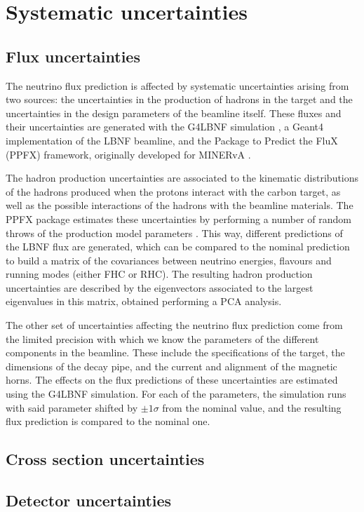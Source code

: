 \section{Systematic uncertainties}

\subsection{Flux uncertainties}

The neutrino flux prediction is affected by systematic uncertainties arising from two sources: the uncertainties in the production of hadrons in the target and the uncertainties in the design parameters of the beamline itself. These fluxes and their uncertainties are generated with the G4LBNF simulation \cite{DUNE2020TDR2}, a Geant4 implementation of the LBNF beamline, and the Package to Predict the FluX (PPFX) framework, originally developed for MINERvA \cite{Golan2016}.

The hadron production uncertainties are associated to the kinematic distributions of the hadrons produced when the protons interact with the carbon target, as well as the possible interactions of the hadrons with the beamline materials. The PPFX package estimates these uncertainties by performing a number of random throws of the production model parameters \cite{Bashyal2017}. This way, different predictions of the LBNF flux are generated, which can be compared to the nominal prediction to build a matrix of the covariances between neutrino energies, flavours and running modes (either FHC or RHC). The resulting hadron production uncertainties are described by the eigenvectors associated to the largest eigenvalues in this matrix, obtained performing a PCA analysis.

The other set of uncertainties affecting the neutrino flux prediction come from the limited precision with which we know the parameters of the different components in the beamline. These include the specifications of the target, the dimensions of the decay pipe, and the current and alignment of the magnetic horns. The effects on the flux predictions of these uncertainties are estimated using the G4LBNF simulation. For each of the parameters, the simulation runs with said parameter shifted by $\pm 1\sigma$ from the nominal value, and the resulting flux prediction is compared to the nominal one.

\subsection{Cross section uncertainties}

\subsection{Detector uncertainties}